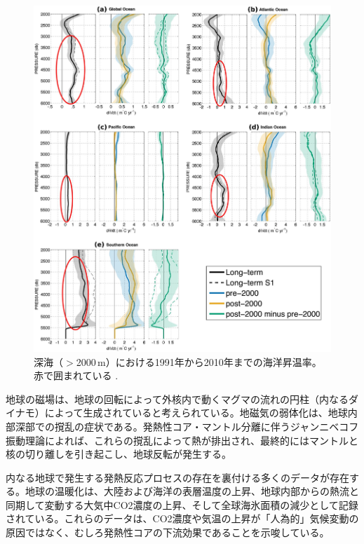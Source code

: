 \documentclass[10pt,twocolumn,letterpaper]{article}
\begin{document}
\begin{figure}[t]
\begin{center}
   \includegraphics[width=1\linewidth]{ocean-highlight.jpg}
\end{center}
   \caption{深海（$>$2000\,m）における1991年から2010年までの海洋昇温率。赤で囲まれている \cite{132}.}
\label{fig:15}
\label{fig:onecol}
\end{figure}

地球の磁場は、地球の回転によって外核内で動くマグマの流れの円柱（内なるダイナモ）によって生成されていると考えられている\cite{123}。地磁気の弱体化は、地球内部深部での撹乱の症状である。発熱性コア・マントル分離に伴うジャンニベコフ振動理論によれば、これらの撹乱によって熱が排出され、最終的にはマントルと核の切り離しを引き起こし、地球反転が発生する\cite{1}。

内なる地球で発生する発熱反応プロセスの存在を裏付ける多くのデータが存在する。地球の温暖化は、大陸および海洋の表層温度の上昇\cite{127,128}、地球内部からの熱流と同期して変動する大気中CO2濃度の上昇\cite{129,130}、そして全球海氷面積の減少\cite{131}として記録されている。これらのデータは、CO2濃度や気温の上昇が「人為的」気候変動の原因ではなく、むしろ発熱性コアの下流効果であることを示唆している\cite{129}。
\end{document}
